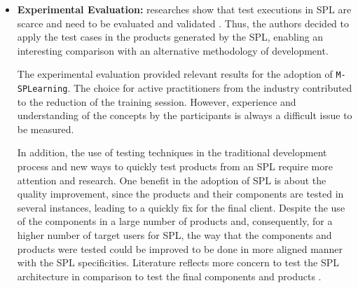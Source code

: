\begin{itemize}
\item \textbf{Experimental Evaluation:} researches show that test executions in SPL are scarce and need to be evaluated and validated \cite{engstrom11}. Thus, the authors decided to apply the test cases in the products generated by the SPL, enabling an interesting comparison with an alternative methodology of development.

The experimental evaluation provided relevant results for the adoption of \texttt{M-SPLear\allowbreak ning}. The choice for active practitioners from the industry contributed to the reduction of the training session. However, experience and understanding of the concepts by the participants is always a difficult issue to be measured.

In addition, the use of testing techniques in the traditional development process and new ways to quickly test products from an SPL require more attention and research. One benefit in the adoption of SPL is about the quality improvement, since the products and their components are tested in several instances, leading to a quickly fix for the final client. Despite the use of the components in a large number of products and, consequently, for a higher number of target users for SPL, the way that the components and products were tested could be improved to be done in more aligned manner with the SPL specificities. Literature reflects more concern to test the SPL architecture in comparison to test the final components and products \cite{machado2014,net2011}.
\end{itemize}